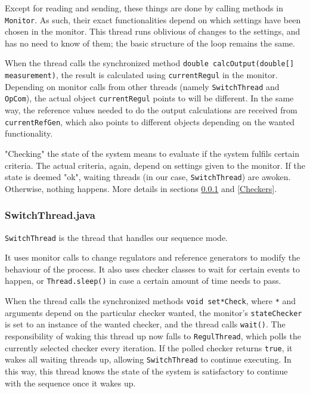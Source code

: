 Except for reading and sending, these things are done by calling methods in \texttt{Monitor}. As such, their exact functionalities depend on which settings have been chosen in the monitor. This thread runs oblivious of changes to the settings, and has no need to know of them; the basic structure of the loop remains the same.

When the thread calls the synchronized method \texttt{double calcOutput(double[] measurement)}, the result is calculated using \texttt{currentRegul} in the monitor. Depending on monitor calls from other threads (namely \texttt{SwitchThread} and \texttt{OpCom}), the actual object \texttt{currentRegul} points to will be different. In the same way, the reference values needed to do the output calculations are received from \texttt{currentRefGen}, which also points to different objects depending on the wanted functionality.

"Checking" the state of the system means to evaluate if the system fulfils certain criteria. The actual criteria, again, depend on settings given to the monitor. If the state is deemed "ok", waiting threads (in our case, \texttt{SwitchThread}) are awoken. Otherwise, nothing happens. More details in sections \ref{SwitchThread} and \ref{Checkers}.



\subsubsection{SwitchThread.java}\label{SwitchThread}
\texttt{SwitchThread} is the thread that handles our sequence mode.

It uses monitor calls to change regulators and reference generators to modify the behaviour of the process. It also uses checker classes to wait for certain events to happen, or \texttt{Thread.sleep()} in case a certain amount of time needs to pass.

When the thread calls the synchronized methods \texttt{void set*Check}, where \texttt{*} and arguments depend on the particular checker wanted, the monitor's \texttt{stateChecker} is set to an instance of the wanted checker, and the thread calls \texttt{wait()}. The responsibility of waking this thread up now falls to \texttt{RegulThread}, which polls the currently selected checker every iteration. If the polled checker returns \texttt{true}, it wakes all waiting threads up, allowing \texttt{SwitchThread} to continue executing. In this way, this thread knows the state of the system is satisfactory to continue with the sequence once it wakes up.

